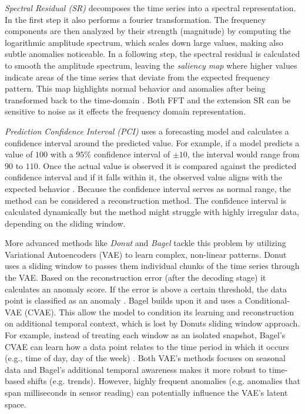 \textit{Spectral Residual (SR)} decomposes the time series into a spectral representation. In the first step it also performs a fourier transformation. The frequency components are then analyzed by their strength (magnitude) by computing the logarithmic amplitude spectrum, which scales down large values, making also subtle anomalies noticeable. In a following step, the spectral residual is calculated to smooth the amplitude spectrum, leaving the \textit{saliency map} where higher values indicate areas of the time series that deviate from the expected frequency pattern. This map highlights normal behavior and anomalies after being transformed back to the time-domain \cite{SR-CNN}. Both FFT and the extension SR can be sensitive to noise as it effects the frequency domain representation. 

\textit{Prediction Confidence Interval (PCI)} uses a forecasting model and calculates a confidence interval around the predicted value. For example, if a model predicts a value of $100$ with a $95\%$ confidence interval of $\pm 10$, the interval would range from $90$ to $110$. Once the actual value is observed it is compared against the predicted confidence interval and if it falls within it, the observed value aligns with the expected behavior \cite{PCI}. Because the confidence interval serves as normal range, the method can be considered a reconstruction method. The confidence interval is calculated dynamically but the method might struggle with highly irregular data, depending on the sliding window.

More advanced methods like \textit{Donut} and \textit{Bagel} tackle this problem by utilizing Variational Autoencoders (VAE) to learn complex, non-linear patterns. Donut uses a sliding window to passes them individual chunks of the time series through the VAE. Based on the reconstruction error (after the decoding stage) it calculates an anomaly score. If the error is above a certain threshold, the data point is classified as an anomaly \cite{Donut}. Bagel builds upon it and uses a Conditional-VAE (CVAE). This allow the model to condition its learning and reconstruction on additional temporal context, which is lost by Donuts sliding window approach. For example, instead of treating each window as an isolated snapshot, Bagel’s CVAE can learn how a data point relates to the time period in which it occurs (e.g., time of day, day of the week) \cite{Bagel}. Both VAE's methods focuses on seasonal data and Bagel's additional temporal awareness makes it more robust to time-based shifts (e.g. trends). However, highly frequent anomalies (e.g. anomalies that span milliseconds in sensor reading) can potentially influence the VAE's latent space. 

